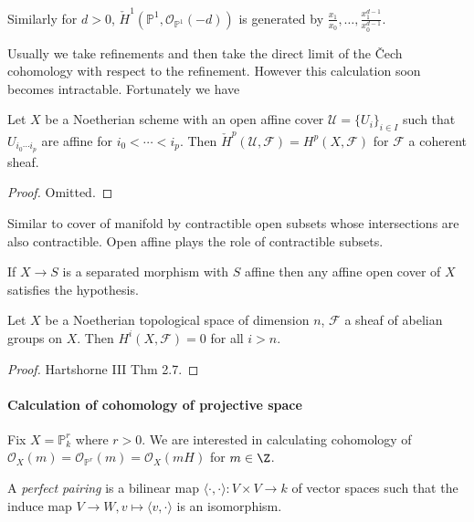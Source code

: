 \documentclass[a4paper]{article}
\renewcommand*{\P}{\mathbb{P}}
\newcommand{\sh}[1]{\mathcal{#1}} %
\begin{document}
\begin{eg}
\begin{enumerate}
    Similarly for \(d > 0\), \(\check H^1(\P^1, \sh O_{\P^1}(-d))\) is generated by \(\frac{x_1}{x_0}, \dots, \frac{x_1^{d - 1}}{x_0^{d - 1}}\).
  \end{enumerate}
\end{eg}

Usually we take refinements and then take the direct limit of the Čech cohomology with respect to the refinement. However this calculation soon becomes intractable. Fortunately we have

\begin{theorem}
  Let \(X\) be a Noetherian scheme with an open affine cover \(\sh U = \{U_i\}_{i \in I}\) such that \(U_{i_0 \cdots i_p}\) are affine for \(i_0 < \cdots < i_p\). Then \(\check H^p(\mathcal U, \sh F) = H^p(X, \sh F)\) for \(\sh F\) a coherent sheaf.
\end{theorem}

\begin{proof}
  Omitted.
\end{proof}

Similar to cover of manifold by contractible open subsets whose intersections are also contractible. Open affine plays the role of contractible subsets.

\begin{remark}
  If \(X \to S\) is a separated morphism with \(S\) affine then any affine open cover of \(X\) satisfies the hypothesis.
\end{remark}

\begin{theorem}[Grothendieck]
  Let \(X\) be a Noetherian topological space of dimension \(n\), \(\sh F\) a sheaf of abelian groups on \(X\). Then \(H^i(X, \sh F) = 0\) for all \(i > n\).
\end{theorem}

\begin{proof}
  Hartshorne III Thm 2.7.
\end{proof}

\paragraph{Calculation of cohomology of projective space}

Fix \(X = \P_k^r\) where \(r > 0\). We are interested in calculating cohomology of \(\sh O_X(m) = \sh O_{\P^r}(m) = \sh O_X(mH)\) for \(m \in \Z\).

\begin{definition}
  A \emph{perfect pairing} is a bilinear map \(\langle \cdot, \cdot \rangle: V \times V \to k\) of vector spaces such that the induce map \(V \to W, v \mapsto \langle v, \cdot \rangle\) is an isomorphism.
\end{definition}
\end{document}
